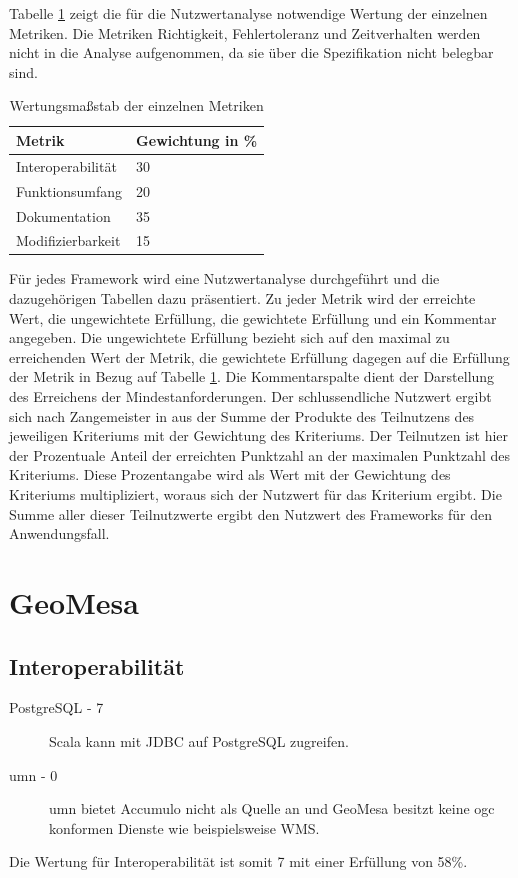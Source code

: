 Tabelle \ref{table:Wertungsmassstab} zeigt die für die Nutzwertanalyse notwendige Wertung der einzelnen Metriken.
Die Metriken Richtigkeit, Fehlertoleranz und Zeitverhalten werden nicht in die Analyse aufgenommen, da sie über die Spezifikation nicht belegbar sind.
\begin{table}[h!]
\centering
\begin{tabular}{l|l}
\textbf{Metrik} & \textbf{Gewichtung in \%} \\ \hline
Interoperabilität & 30 \\ \hline
Funktionsumfang & 20 \\ \hline
Dokumentation & 35 \\ \hline
Modifizierbarkeit & 15
\end{tabular}
\caption{Wertungsmaßstab der einzelnen Metriken}
\label{table:Wertungsmassstab}
\end{table}

Für jedes Framework wird eine Nutzwertanalyse durchgeführt und die dazugehörigen Tabellen dazu präsentiert.
Zu jeder Metrik wird der erreichte Wert, die ungewichtete Erfüllung, die gewichtete Erfüllung und ein Kommentar angegeben.
Die ungewichtete Erfüllung bezieht sich auf den maximal zu erreichenden Wert der Metrik, die gewichtete Erfüllung dagegen auf die Erfüllung der Metrik in Bezug auf Tabelle \ref{table:Wertungsmassstab}.
Die Kommentarspalte dient der Darstellung des Erreichens der Mindestanforderungen.
Der schlussendliche Nutzwert ergibt sich nach Zangemeister in \cite{website:nutzwertanalyse} aus der Summe der Produkte des Teilnutzens des jeweiligen Kriteriums mit der Gewichtung des Kriteriums.
Der Teilnutzen ist hier der Prozentuale Anteil der erreichten Punktzahl an der maximalen Punktzahl des Kriteriums.
Diese Prozentangabe wird als Wert mit der Gewichtung des Kriteriums multipliziert, woraus sich der Nutzwert für das Kriterium ergibt.
Die Summe aller dieser Teilnutzwerte ergibt den Nutzwert des Frameworks für den Anwendungsfall.

\section{GeoMesa}

\subsection{Interoperabilität}
\begin{description}
\item[PostgreSQL - 7] Scala  kann mit JDBC auf PostgreSQL zugreifen.
\item[\Gls{umn} - 0] \Gls{umn} bietet Accumulo nicht als Quelle an und GeoMesa besitzt keine \Gls{ogc} konformen Dienste wie beispielsweise WMS.
\end{description}
Die Wertung für Interoperabilität ist somit 7 mit einer Erfüllung von 58\%.

